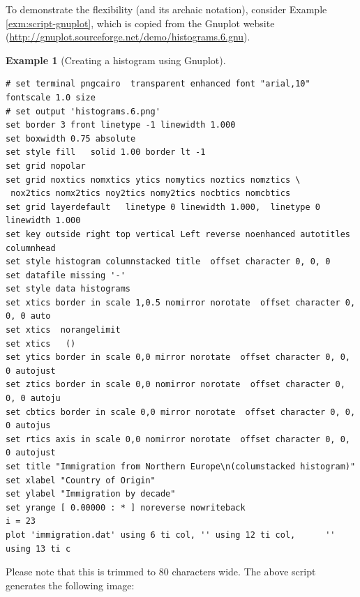 \documentclass[
]{book}
\theoremstyle{definition}
\theoremstyle{definition}
\newtheorem{example}{Example}[chapter]
\theoremstyle{definition}
\theoremstyle{remark}
\begin{document}
To demonstrate the flexibility (and its archaic notation), consider Example \ref{exm:script-gnuplot}, which is copied from the Gnuplot website (\url{http://gnuplot.sourceforge.net/demo/histograms.6.gnu}).

\begin{example}[Creating a histogram using Gnuplot]
\protect\hypertarget{exm:script-gnuplot}{}{\label{exm:script-gnuplot} {} }
\end{example}

\begin{verbatim}
# set terminal pngcairo  transparent enhanced font "arial,10" fontscale 1.0 size
# set output 'histograms.6.png'
set border 3 front linetype -1 linewidth 1.000
set boxwidth 0.75 absolute
set style fill   solid 1.00 border lt -1
set grid nopolar
set grid noxtics nomxtics ytics nomytics noztics nomztics \
 nox2tics nomx2tics noy2tics nomy2tics nocbtics nomcbtics
set grid layerdefault   linetype 0 linewidth 1.000,  linetype 0 linewidth 1.000
set key outside right top vertical Left reverse noenhanced autotitles columnhead
set style histogram columnstacked title  offset character 0, 0, 0
set datafile missing '-'
set style data histograms
set xtics border in scale 1,0.5 nomirror norotate  offset character 0, 0, 0 auto
set xtics  norangelimit
set xtics   ()
set ytics border in scale 0,0 mirror norotate  offset character 0, 0, 0 autojust
set ztics border in scale 0,0 nomirror norotate  offset character 0, 0, 0 autoju
set cbtics border in scale 0,0 mirror norotate  offset character 0, 0, 0 autojus
set rtics axis in scale 0,0 nomirror norotate  offset character 0, 0, 0 autojust
set title "Immigration from Northern Europe\n(columstacked histogram)"
set xlabel "Country of Origin"
set ylabel "Immigration by decade"
set yrange [ 0.00000 : * ] noreverse nowriteback
i = 23
plot 'immigration.dat' using 6 ti col, '' using 12 ti col,      '' using 13 ti c
\end{verbatim}

Please note that this is trimmed to 80 characters wide. The above script generates the following image:
\end{document}
